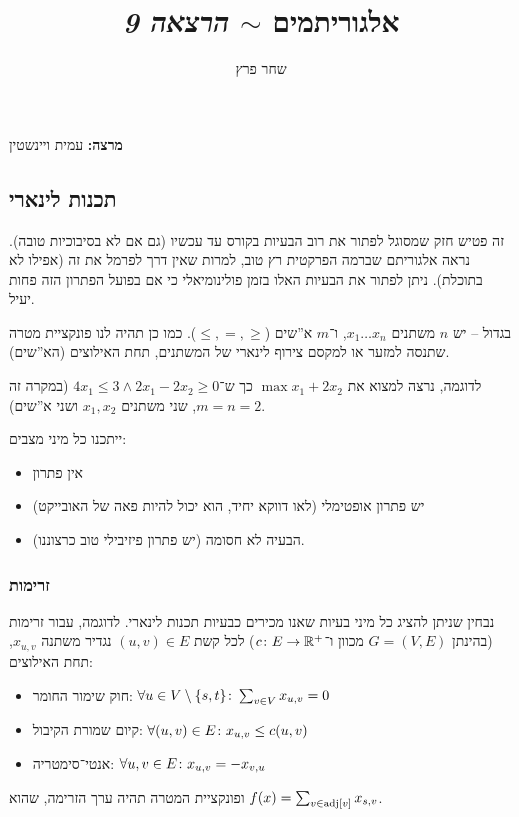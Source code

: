 \documentclass[]{../../../../tex/classes/styledArticle}
\author{שחר פרץ}
\title{אלגוריתמים $\sim$ \textit{הרצאה 9}}
\begin{document}
	\maketitle
	\textbf{מרצה: }עמית ויינשטין
	
	\subsection*{תכנות לינארי}
	זה פטיש חזק שמסוגל לפתור את רוב הבעיות בקורס עד עכשיו (גם אם לא בסיבוכיות טובה). נראה אלגוריתם שברמה הפרקטית רץ טוב, למרות שאין דרך לפרמל את זה (אפילו לא בתוכלת). ניתן לפתור את הבעיות האלו בזמן פולינומיאלי כי אם בפועל הפתרון הזה פחות יעיל. 
	
	בגדול – יש $n$ משתנים $x_1 \dots x_n$, ו־$m$ א''שים ($\le, =, \ge$). כמו כן תהיה לנו פונקציית מטרה שתנסה למזער או למקסם צירוף לינארי של המשתנים, תחת האילוצים (הא''שים). 
	
	לדוגמה, נרצה למצוא את $\max x_1 + 2x_2$ כך ש־$4x_1 \le 3 \land 2x_1 - 2x_2 \ge 0$ (במקרה זה $m = n = 2$, שני משתנים $x_1, x_2$ ושני א''שים). 
	
	
	ייתכנו כל מיני מצבים: 
	\begin{itemize}
		\item אין פתרון
		\item יש פתרון אופטימלי (לאו דווקא יחיד, הוא יכול להיות פאה של האובייקט)
		\item הבעיה לא חסומה (יש פתרון פיזיבילי טוב כרצוננו). 
	\end{itemize}
	
	
	\subsubsection*{זרימות}
	נבחין שניתן להציג כל מיני בעיות שאנו מכירים כבעיות תכנות לינארי. לדוגמה, עבור זרימות (בהינתן $G =(V, E)$ מכוון ו־$c \colon E \to \mathbb{R}^{+}$) לכל קשת $(u, v) \in E$ נגדיר משתנה $x_{u, v}$, תחת האילוצים: 
	\begin{itemize}
		\item חוק שימור החומר: $\forall u \in V \setminus \{s, t\} \colon \sum_{v \in V}x_{u, v} = 0$
		\item קיום שמורת הקיבול: $\forall (u, v) \in E \colon x_{u, v} \le c(u, v)$
		\item אנטי־סימטריה: $\forall u, v \in E \colon x_{u, v} = -x_{v, u}$
	\end{itemize}
	ופונקציית המטרה תהיה ערך הזרימה, שהוא $f(x) = \sum_{v \in \operatorname{adj}[v]}x_{s, v}$. 
	
\end{document}
